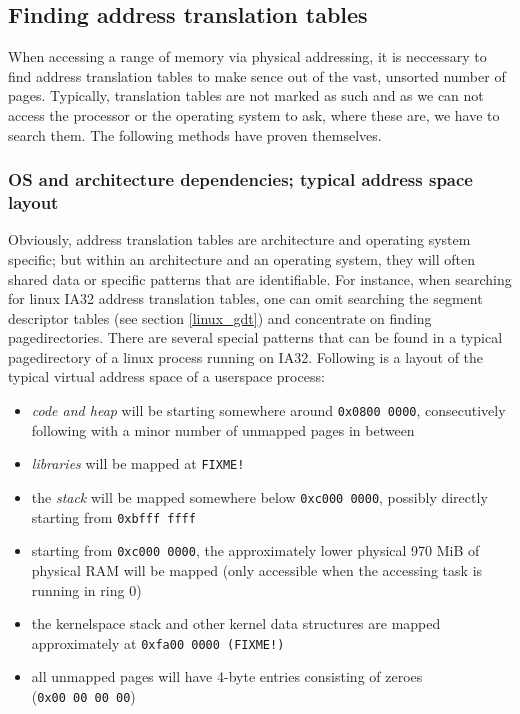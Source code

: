 \subsection{Finding address translation tables}
\label{findingATT}

When accessing a range of memory via physical addressing, it is neccessary to
find address translation tables to make sence out of the vast, unsorted number
of pages. Typically, translation tables are not marked as such and as we can not
access the processor or the operating system to ask, where these are, we have to
search them. The following methods have proven themselves.



\subsubsection{OS and architecture dependencies; typical address space layout}

Obviously, address translation tables are architecture and operating system
specific; but within an architecture and an operating system, they will often
shared data or specific patterns that are identifiable. For instance, when
searching for linux IA32 address translation tables, one can omit searching the
segment descriptor tables (see section \ref{linux_gdt}) and concentrate on
finding pagedirectories. There are several special patterns that can be found in
a typical pagedirectory of a linux process running on IA32. Following is a
layout of the typical virtual address space of a userspace process:

\begin{itemize}

	\item \emph{code and heap} will be starting somewhere around
	\texttt{0x0800~0000}, consecutively following with a minor number of
	unmapped pages in between

	\item \emph{libraries} will be mapped at \texttt{FIXME!}

	\item the \emph{stack} will be mapped somewhere below
	\texttt{0xc000~0000}, possibly directly starting from
	\texttt{0xbfff~ffff}

	\item starting from \texttt{0xc000~0000}, the approximately lower
	physical 970 MiB of physical RAM will be mapped (only accessible when
	the accessing task is running in ring 0)

	\item the kernelspace stack and other kernel data structures are mapped
	approximately at \texttt{0xfa00~0000 (FIXME!)}

	\item all unmapped pages will have 4-byte entries consisting of zeroes
	(\texttt{0x00~00~00~00})

\end{itemize}

